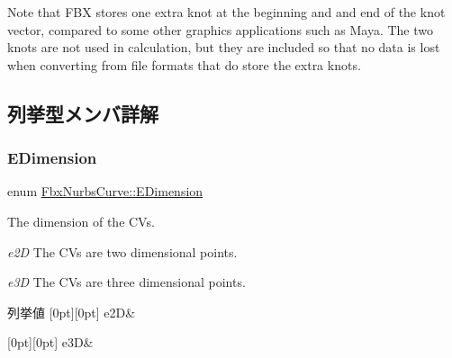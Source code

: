 Note that F\+BX stores one extra knot at the beginning and and end of the knot vector, compared to some other graphics applications such as Maya. The two knots are not used in calculation, but they are included so that no data is lost when converting from file formats that do store the extra knots. 

\subsection{列挙型メンバ詳解}
\mbox{\label{class_fbx_nurbs_curve_a95d4a63cff6dd62901ea39c268336122}} 
\subsubsection{\texorpdfstring{E\+Dimension}{EDimension}}
{\footnotesize\ttfamily enum \hyperlink{class_fbx_nurbs_curve_a95d4a63cff6dd62901ea39c268336122}{Fbx\+Nurbs\+Curve\+::\+E\+Dimension}}

The dimension of the C\+Vs.
\begin{DoxyItemize}
\item {\itshape e2D} The C\+Vs are two dimensional points.
\item {\itshape e3D} The C\+Vs are three dimensional points. 
\end{DoxyItemize}\begin{DoxyEnumFields}{列挙値}
[0pt][0pt]{}\mbox{\label{class_fbx_nurbs_curve_a95d4a63cff6dd62901ea39c268336122aa19c626c6b5212fad0925ae176b55a75}} 
e2D&\\
\hline

[0pt][0pt]{}\mbox{\label{class_fbx_nurbs_curve_a95d4a63cff6dd62901ea39c268336122ae726a5a8f85e1caff03b1dbb7b5c1faf}} 
e3D&\\
\hline

\end{DoxyEnumFields}
\mbox{\label{class_fbx_nurbs_curve_a6f0e188ec4b87e234b4c745098263f1d}} 

